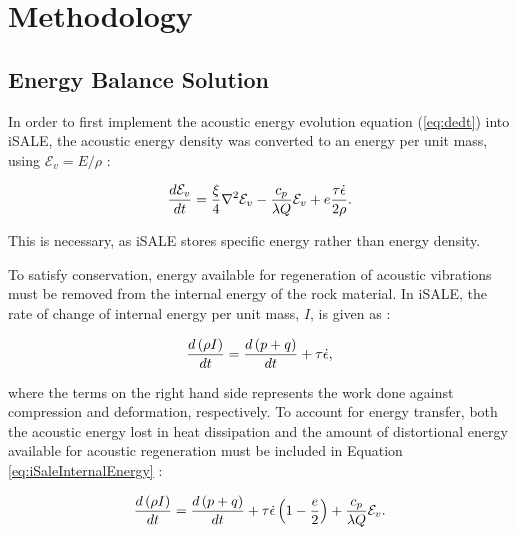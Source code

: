 \section{Methodology}

\subsection{Energy Balance Solution}

In order to first implement the acoustic energy evolution equation (\ref{eq:dedt}) into iSALE, the acoustic energy density was converted to an energy per unit mass, using $\mathcal{E}_{v}=E/\rho$ \citep{collins2003acoustic}:

\begin{equation}\label{eqdedtmass}
\frac{d \mathcal{E}_{v}}{d t} = \frac{\xi}{4} \nabla^{2}\mathcal{E}_{v} - \frac{c_{p}}{\lambda Q}\mathcal{E}_{v} + e \frac{\tau \dot{\epsilon}}{2\rho}.\vspace{0.2cm}
\end{equation}

This is necessary, as iSALE stores specific energy rather than energy density.

To satisfy conservation, energy available for regeneration of acoustic vibrations must be removed from the internal energy of the rock material. In iSALE, the rate of change of internal energy per unit mass, $I$, is given as \citep{collins2002numerical}:

\begin{equation}\label{eq:iSaleInternalEnergy}
\frac{d \left( \rho I\right)}{d t} =\frac{d \left(p + q\right)}{d t} + \tau \dot{\epsilon},\vspace{0.2cm}
\end{equation}

where the terms on the right hand side represents the work done against compression and deformation, respectively. To account for energy transfer, both the acoustic energy lost in heat dissipation and the amount of distortional energy available for acoustic regeneration must be included in Equation \ref{eq:iSaleInternalEnergy} \citep{collins2002numerical}:

\begin{equation}\label{eq:iSaleInternalEnergyAcoustic}
\frac{d \left(\rho I\right)}{d t} =\frac{d \left(p + q\right)}{d t} + \tau \dot{\epsilon}\left(1-\frac{e}{2}\right)+\frac{c_{p}}{\lambda Q}\mathcal{E}_{v}.\vspace{0.2cm}
\end{equation}

